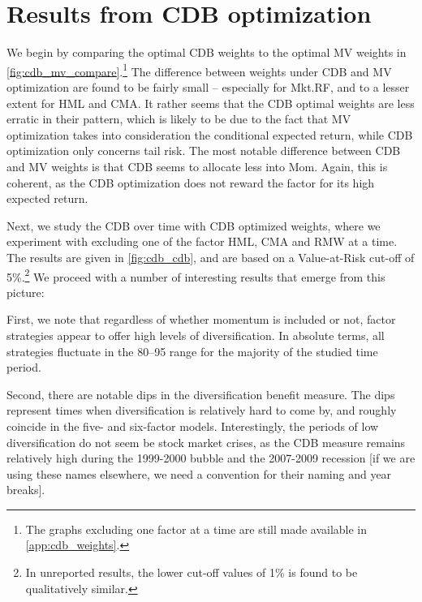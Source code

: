 
\section{Results from CDB optimization} %
\label{sec:cdb_optimization}


We begin by comparing the optimal CDB weights to the optimal MV weights in \autoref{fig:cdb_mv_compare}.\footnote{The graphs excluding one factor at a time are still made available in \autoref{app:cdb_weights}.} The difference between weights under CDB and MV optimization are found to be fairly small -- especially for Mkt.RF, and to a lesser extent for HML and CMA.  It rather seems that the CDB optimal weights are less erratic in their pattern, which is likely to be due to the fact that MV optimization takes into consideration the conditional expected return, while CDB optimization only concerns tail risk. The most notable difference between CDB and MV weights is that CDB seems to allocate less into Mom. Again, this is coherent, as the CDB optimization does not reward the factor for its high expected return. 

Next, we study the CDB over time with CDB optimized weights, where we experiment with excluding one of the factor HML, CMA and RMW at a time. The results are given in \autoref{fig:cdb_cdb}, and are based on a Value-at-Risk cut-off of 5\%.\footnote{In unreported results, the lower cut-off values of 1\% is found to be qualitatively similar.} We proceed with a number of interesting results that emerge from this picture:

First, we note that regardless of whether momentum is included or not, factor strategies appear to offer high levels of diversification. In absolute terms, all strategies fluctuate in the 80--95 range for the majority of the studied time period. 

Second, there are notable dips in the diversification benefit measure. The dips represent times when diversification is relatively hard to come by, and roughly coincide in the five- and six-factor models. Interestingly, the periods of low diversification do not seem be stock market crises, as the CDB measure remains relatively high during the 1999-2000 bubble and the 2007-2009 recession [if we are using these names elsewhere, we need a convention for their naming and year breaks].

